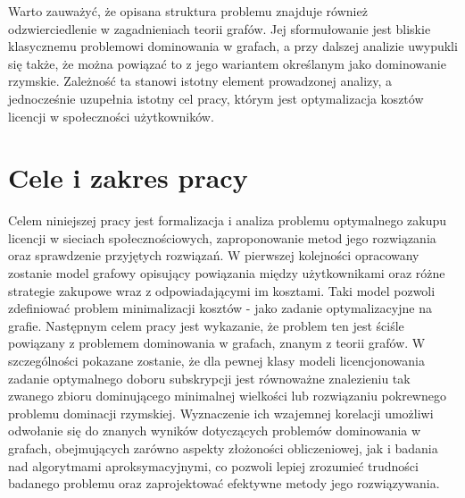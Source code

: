 Warto zauważyć, że opisana struktura problemu znajduje również odzwierciedlenie w zagadnieniach teorii grafów. Jej sformułowanie jest bliskie klasycznemu problemowi dominowania w grafach, a przy dalszej analizie uwypukli się także, że można powiązać to z jego wariantem określanym jako dominowanie rzymskie. Zależność ta stanowi istotny element prowadzonej analizy, a jednocześnie uzupełnia istotny cel pracy, którym jest optymalizacja kosztów licencji w społeczności użytkowników.

\section{Cele i zakres pracy}
Celem niniejszej pracy jest formalizacja i analiza problemu optymalnego zakupu licencji w sieciach społecznościowych, zaproponowanie metod jego rozwiązania oraz sprawdzenie przyjętych rozwiązań. W pierwszej kolejności opracowany zostanie model grafowy opisujący powiązania między użytkownikami oraz różne strategie zakupowe wraz z odpowiadającymi im kosztami. Taki model pozwoli zdefiniować problem minimalizacji kosztów - jako zadanie optymalizacyjne na grafie. Następnym celem pracy jest wykazanie, że problem ten jest ściśle powiązany z problemem dominowania w grafach, znanym z teorii grafów. W szczególności pokazane zostanie, że dla pewnej klasy modeli licencjonowania zadanie optymalnego doboru subskrypcji jest równoważne znalezieniu tak zwanego zbioru dominującego minimalnej wielkości lub rozwiązaniu pokrewnego problemu dominacji rzymskiej. Wyznaczenie ich wzajemnej korelacji umożliwi odwołanie się do znanych wyników dotyczących problemów dominowania w grafach, obejmujących zarówno aspekty złożoności obliczeniowej, jak i badania nad algorytmami aproksymacyjnymi, co pozwoli lepiej zrozumieć trudności badanego problemu oraz zaprojektować efektywne metody jego rozwiązywania.

